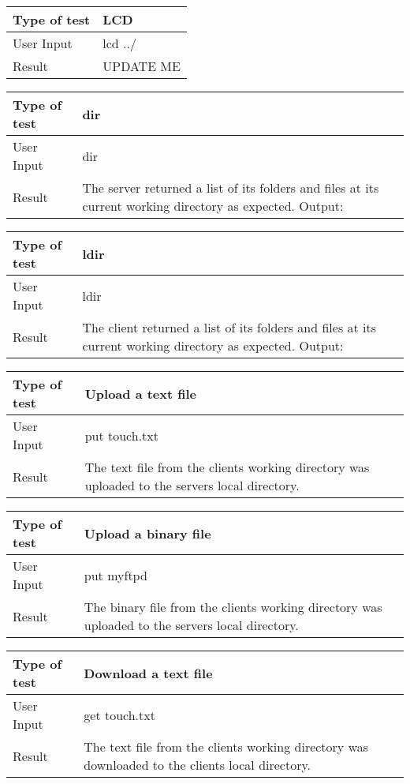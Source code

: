 \documentclass{article}
\begin{document}
    \newline
    \begin{tabulary}{1.0\textwidth}{|L|L|}
    \hline Type of test & LCD\\
    \hline User Input & lcd ../\\
    \hline Result & UPDATE ME\\
    \hline
    \end{tabulary}
    \newline
    \begin{tabulary}{1.0\textwidth}{|L|L|}
    \hline Type of test & dir\\
    \hline User Input & dir\\
    \hline Result & The server returned a list of its folders and files at its current working directory as expected. Output: \\
    \hline
    \end{tabulary}
    \newline
    \begin{tabulary}{1.0\textwidth}{|L|L|}
    \hline Type of test & ldir\\
    \hline User Input & ldir\\
    \hline Result & The client returned a list of its folders and files at its current working directory as expected. Output: \\
    \hline
    \end{tabulary}
    \newline
    \begin{tabulary}{1.0\textwidth}{|L|L|}
    \hline Type of test & Upload a text file\\
    \hline User Input & put touch.txt\\
    \hline Result & The text file from the clients working directory was uploaded to the servers local directory.\\
    \hline
    \end{tabulary}
    \newline
    \begin{tabulary}{1.0\textwidth}{|L|L|}
    \hline Type of test & Upload a binary file\\
    \hline User Input & put myftpd\\
    \hline Result & The binary file from the clients working directory was uploaded to the servers local directory. \\
    \hline
    \end{tabulary}
    \newline
    \begin{tabulary}{1.0\textwidth}{|L|L|}
    \hline Type of test & Download a text file\\
    \hline User Input & get touch.txt\\
    \hline Result & The text file from the clients working directory was downloaded to the clients local directory.\\
    \hline
    \end{tabulary}
\end{document}
